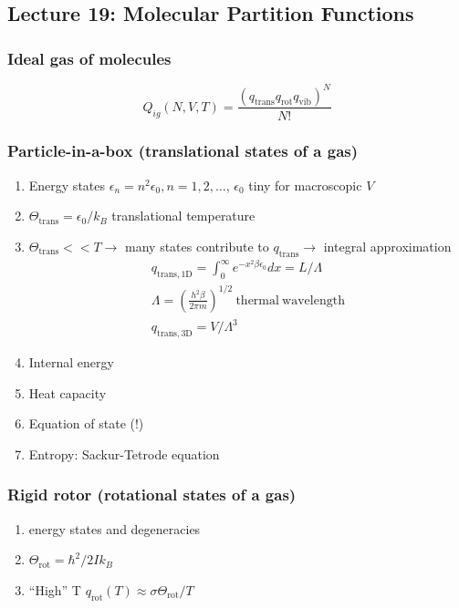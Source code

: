 \documentclass[11pt]{article}
\begin{document}
\subsection{Lecture 19: Molecular Partition Functions}
\label{sec:org5c1526d}
\subsubsection{Ideal gas of molecules}
\label{sec:org8924053}
\begin{displaymath}
  Q_{ig}(N,V,T) = \frac{(q_\mathrm{trans}q_\mathrm{rot}q_\mathrm{vib})^N}{N!}
\end{displaymath}

\subsubsection{Particle-in-a-box (translational states of a gas)}
\label{sec:orgc169557}
\begin{enumerate}
\item Energy states \(\epsilon_n=n^2\epsilon_0, n=1,2, \ldots\), \(\epsilon_0\) tiny for macroscopic \(V\)
\item \(\Theta_\mathrm{trans} = \epsilon_0/k_B\) translational temperature
\item \(\Theta_\mathrm{trans} << T \rightarrow\) many states contribute to \(q_\mathrm{trans}\rightarrow\) integral approximation
\begin{eqnarray*}
  q_\mathrm{trans,1D} = \int_0^\infty e^{-x^2\beta\epsilon_0}dx =
  L/\Lambda \\
  \Lambda = \left ( \frac{h^2\beta}{2\pi m} \right )^{1/2}\
  \mathrm{thermal\ wavelength} \\
  q_\mathrm{trans,3D} = V/\Lambda^3
\end{eqnarray*}
\item Internal energy
\item Heat capacity
\item Equation of state (!)
\item Entropy: Sackur-Tetrode equation
\end{enumerate}

\subsubsection{Rigid rotor (rotational states of a gas)}
\label{sec:org2e0954e}
\begin{enumerate}
\item energy states and degeneracies
\item \(\Theta_\mathrm{rot} = \hbar^2/2 I k_B\)
\item ``High'' T \(q_\mathrm{rot}(T) \approx \sigma \Theta_\mathrm{rot}/T\)
\end{enumerate}
\end{document}
